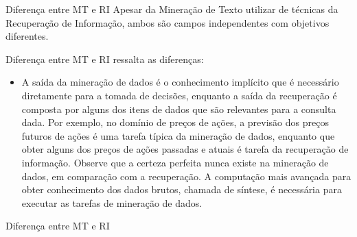 \documentclass[%
  10pt,%
  aspectratio = 169,%
  compress,%
  t,%
]{beamer}%
\begin{document}
    \begin{frame}[fragile = singleslide]{}{Diferença entre MT e RI}
        Apesar da Mineração de Texto utilizar de técnicas da Recuperação de Informação, ambos são campos independentes com objetivos diferentes.

        \begin{block}{Diferença entre MT e RI}
            \cite[p.~4, tradução nossa]{Jo2018TMCIBDC} ressalta as diferenças:
            \begin{itemize}
                \item A saída da mineração de dados é o conhecimento implícito que é necessário diretamente para a tomada de decisões, enquanto a saída da recuperação é composta por alguns dos itens de dados que são relevantes para a consulta dada. 
                Por exemplo, no domínio de preços de ações, a previsão dos preços futuros de ações é uma tarefa típica da mineração de dados, enquanto que obter alguns dos preços de ações passadas e atuais é tarefa da recuperação de informação. 
                Observe que a certeza perfeita nunca existe na mineração de dados, em comparação com a recuperação. 
                A computação mais avançada para obter conhecimento dos dados brutos, chamada de síntese, é necessária para executar as tarefas de mineração de dados.
            \end{itemize}
        \end{block}
    \end{frame}
    
    \begin{frame}{}{Diferença entre MT e RI}
        
    \end{frame}
    
\end{document}
